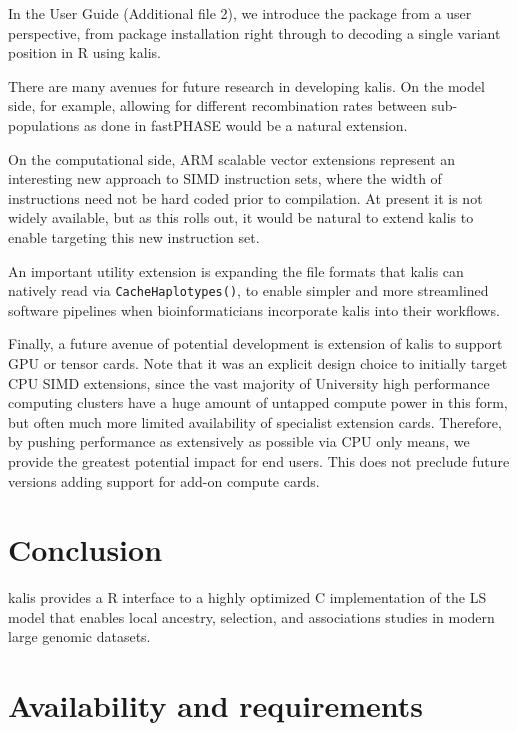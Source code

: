 \documentclass[pdflatex,referee,lineno,sn-nature]{sn-jnl}%
\let\proglang=\textsf
\newcommand{\pkg}[1]{{\fontseries{m}\fontseries{b}\selectfont #1}}
\begin{document}
In the User Guide (Additional file 2), we introduce the package from a user perspective, from package installation right through to decoding a single variant position in \proglang{R} using \pkg{kalis}.

There are many avenues for future research in developing \pkg{kalis}.
On the model side, for example, allowing for different recombination rates between sub-populations as done in fastPHASE \cite{scheet2006fast} would be a natural extension.

On the computational side, ARM scalable vector extensions \cite{armsve} represent an interesting new approach to SIMD instruction sets, where the width of instructions need not be hard coded prior to compilation.
At present it is not widely available, but as this rolls out, it would be natural to extend \pkg{kalis} to enable targeting this new instruction set.

An important utility extension is expanding the file formats that \pkg{kalis} can natively read via \texttt{CacheHaplotypes()}, to enable simpler and more streamlined software pipelines when bioinformaticians incorporate \pkg{kalis} into their workflows.

Finally, a future avenue of potential development is extension of \pkg{kalis} to support GPU or tensor cards.
Note that it was an explicit design choice to initially target CPU SIMD extensions, since the vast majority of University high performance computing clusters have a huge amount of untapped compute power in this form, but often much more limited availability of specialist extension cards.
Therefore, by pushing performance as extensively as possible via CPU only means, we provide the greatest potential impact for end users.
This does not preclude future versions adding support for add-on compute cards.



\section*{Conclusion}

\pkg{kalis} provides a \proglang{R} interface to a highly optimized \proglang{C} implementation of the LS model that enables local ancestry, selection, and associations studies in modern large genomic datasets.



\section*{Availability and requirements}
\end{document}
